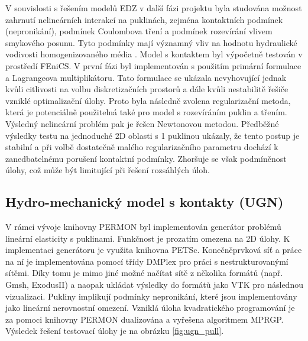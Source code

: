 \documentclass[11pt,a4paper]{article}
\newcommand{\sy}[1]{{\color{blue} SS: #1}}
\begin{document}
\begin{onehalfspacing}
V souvislosti s řešením modelů EDZ v další fázi projektu byla studována možnost zahrnutí nelineárních 
interakcí na puklinách, zejména kontaktních podmínek (nepronikání), podmínek Coulombova tření a podmínek rozevírání vlivem smykového posunu.
Tyto podmínky mají významný vliv na hodnotu hydraulické vodivosti homogenizovaného média \cite{min_2004}.
Model s kontaktem byl výpočetně testován v prostředí FEniCS. V první fázi byl implementován s použitím primární formulace 
a Lagrangeova multiplikátoru. Tato formulace se ukázala nevyhovující jednak kvůli citlivosti na volbu diskretizačních 
prostorů a dále kvůli nestabilitě řešiče vzniklé optimalizační úlohy. Proto byla následně zvolena regularizační metoda, 
která je potenciálně použitelná také pro model s rozevíráním puklin a třením. Výsledný nelineární problém pak je řešen 
Newtonovou metodou. Předběžné výsledky testu na jednoduché 2D oblasti s 1 puklinou ukázaly, že tento postup je stabilní 
a při volbě dostatečně malého regularizačního parametru dochází k zanedbatelnému porušení kontaktní podmínky. Zhoršuje 
se však podmíněnost úlohy, což může být limitující při řešení rozsáhlých úloh.




\subsection{Hydro-mechanický model s kontakty (UGN)}

V rámci vývoje knihovny PERMON byl implementován generátor problémů lineární
elasticity s puklinami. Funkčnost je prozatím omezena na 2D úlohy. K
implementaci generátoru je využita knihovna PETSc. Konečněprvková síť a
práce na ní je implementována pomocí třídy DMPlex pro práci s
nestrukturovanýmí sítěmi. Díky tomu je mimo jiné možné načítat sítě z
několika formátů (např. Gmsh, ExodusII) a naopak ukládat výsledky do
formátů jako VTK pro následnou vizualizaci. Pukliny implikují podmínky
nepronikání, které jsou implementovány jako lineární nerovnostní
omezení. Vzniklá úloha kvadratického programování je za pomoci knihovny
PERMON dualizována a vyřešena algoritmem MPRGP. 
Výsledek řešení testovací úlohy je na obrázku \ref{fig:ugn_pull}.


\end{onehalfspacing}
\end{document}
